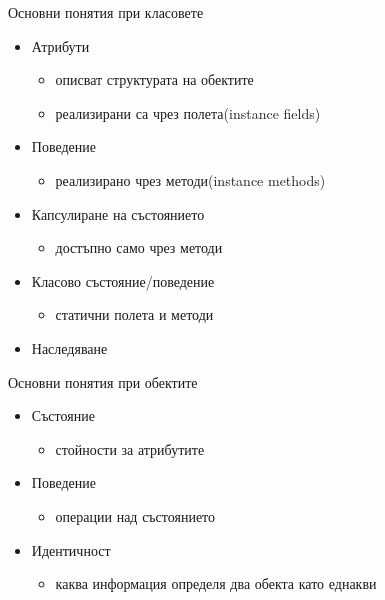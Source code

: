 \documentclass{beamer}
\begin{document}
\begin{frame}{Основни понятия при класовете}
  \transdissolve
  \begin{itemize}
  \item Атрибути
    \begin{itemize}
    \item описват структурата на обектите
    \item реализирани са чрез полета(instance fields)
    \end{itemize}
  \item Поведение
    \begin{itemize}
    \item реализирано чрез методи(instance methods)
    \end{itemize}
  \item Капсулиране на състоянието 
    \begin{itemize}
    \item достъпно само чрез методи
    \end{itemize}
  \item Класово състояние/поведение
    \begin{itemize}
    \item статични полета и методи
    \end{itemize}
  \item Наследяване
  \end{itemize}
\end{frame}

\begin{frame}{Основни понятия при обектите}
  \transdissolve
  \begin{itemize}
  \item Състояние
    \begin{itemize}
    \item стойности за атрибутите
    \end{itemize}
  \item Поведение
    \begin{itemize}
    \item операции над състоянието
    \end{itemize}
  \item Идентичност
    \begin{itemize}
    \item каква информация определя два обекта като еднакви 
    \end{itemize}
  \end{itemize}
\end{frame}
\end{document}

